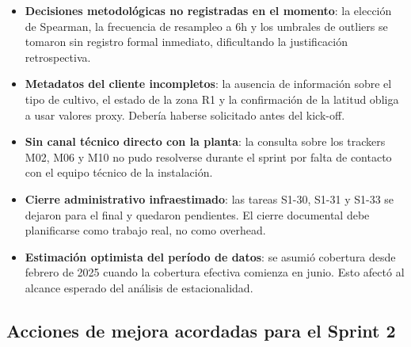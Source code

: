 \documentclass[12pt,a4paper]{article}
\begin{document}
\begin{itemize}
  \item \textbf{Decisiones metodológicas no registradas en el momento}: la elección de Spearman, la frecuencia de resampleo a 6h y los umbrales de outliers se tomaron sin registro formal inmediato, dificultando la justificación retrospectiva.
  \item \textbf{Metadatos del cliente incompletos}: la ausencia de información sobre el tipo de cultivo, el estado de la zona R1 y la confirmación de la latitud obliga a usar valores proxy. Debería haberse solicitado antes del kick-off.
  \item \textbf{Sin canal técnico directo con la planta}: la consulta sobre los trackers M02, M06 y M10 no pudo resolverse durante el sprint por falta de contacto con el equipo técnico de la instalación.
  \item \textbf{Cierre administrativo infraestimado}: las tareas S1-30, S1-31 y S1-33 se dejaron para el final y quedaron pendientes. El cierre documental debe planificarse como trabajo real, no como overhead.
  \item \textbf{Estimación optimista del período de datos}: se asumió cobertura desde febrero de 2025 cuando la cobertura efectiva comienza en junio. Esto afectó al alcance esperado del análisis de estacionalidad.
\end{itemize}

\subsection{Acciones de mejora acordadas para el Sprint 2}
\end{document}
